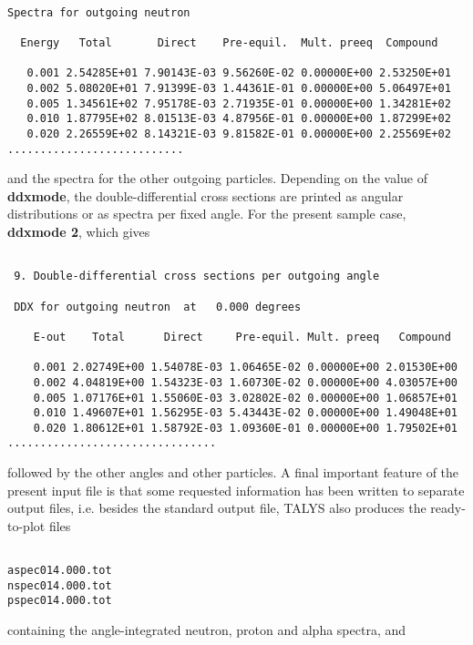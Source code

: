 \begin{samplecase}
{\small \begin{verbatim}

Spectra for outgoing neutron

  Energy   Total       Direct    Pre-equil.  Mult. preeq  Compound

   0.001 2.54285E+01 7.90143E-03 9.56260E-02 0.00000E+00 2.53250E+01
   0.002 5.08020E+01 7.91399E-03 1.44361E-01 0.00000E+00 5.06497E+01
   0.005 1.34561E+02 7.95178E-03 2.71935E-01 0.00000E+00 1.34281E+02
   0.010 1.87795E+02 8.01513E-03 4.87956E-01 0.00000E+00 1.87299E+02
   0.020 2.26559E+02 8.14321E-03 9.81582E-01 0.00000E+00 2.25569E+02
...........................
\end{verbatim} } \renewcommand{\baselinestretch}{1.07}\small\normalsize
\noindent
and the spectra for the other outgoing particles.
Depending on the value of {\bf ddxmode}, the double-differential cross 
sections are printed as angular distributions or as spectra per fixed angle.
For the present sample case, {\bf ddxmode 2}, which gives

{\small \begin{verbatim}

 9. Double-differential cross sections per outgoing angle

 DDX for outgoing neutron  at   0.000 degrees

    E-out    Total      Direct     Pre-equil. Mult. preeq   Compound

    0.001 2.02749E+00 1.54078E-03 1.06465E-02 0.00000E+00 2.01530E+00
    0.002 4.04819E+00 1.54323E-03 1.60730E-02 0.00000E+00 4.03057E+00
    0.005 1.07176E+01 1.55060E-03 3.02802E-02 0.00000E+00 1.06857E+01
    0.010 1.49607E+01 1.56295E-03 5.43443E-02 0.00000E+00 1.49048E+01
    0.020 1.80612E+01 1.58792E-03 1.09360E-01 0.00000E+00 1.79502E+01
................................
\end{verbatim} } \renewcommand{\baselinestretch}{1.07}\small\normalsize
\noindent
followed by the other angles and other particles.
A final important feature of the present input file is that some requested 
information has been written to separate output files, i.e. besides the 
standard output file, TALYS also produces the ready-to-plot files

{\small \begin{verbatim}

aspec014.000.tot
nspec014.000.tot
pspec014.000.tot      
\end{verbatim} } \renewcommand{\baselinestretch}{1.07}\small\normalsize
\noindent
containing the angle-integrated neutron, proton and alpha spectra, and
{\small \begin{verbatim}


\end{verbatim}}
\end{samplecase}
